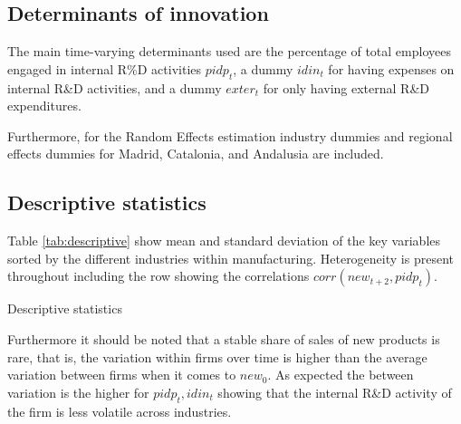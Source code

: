 \subsection{Determinants of innovation}
\label{subsec:determinants}
The main time-varying determinants used are the percentage of total employees engaged in internal R\%D activities $pidp_t$, a dummy $idin_t$ for having expenses on internal R\&D activities, and a dummy $exter_t$ for only having external R\&D expenditures.

Furthermore, for the Random Effects estimation industry dummies and regional effects dummies for Madrid, Catalonia, and Andalusia are included.

\subsection{Descriptive statistics}
\label{subsec:descriptive}
Table \ref{tab:descriptive} show mean and standard deviation of the key variables sorted by the different industries within manufacturing. Heterogeneity is present throughout including the row showing the correlations $corr(new_{t+2},pidp_t)$.
\begin{table}[H]
  \centering
  \caption{Descriptive statistics}
  \footnotesize
    
  \label{tab:descriptive}
\end{table}
Furthermore it should be noted that a stable share of sales of new products is rare, that is, the variation within firms over time is higher than the average variation between firms when it comes to $new_0$. As expected the between variation is the higher for $pidp_t,idin_t$ showing that the internal R\&D activity of the firm is less volatile across industries.

